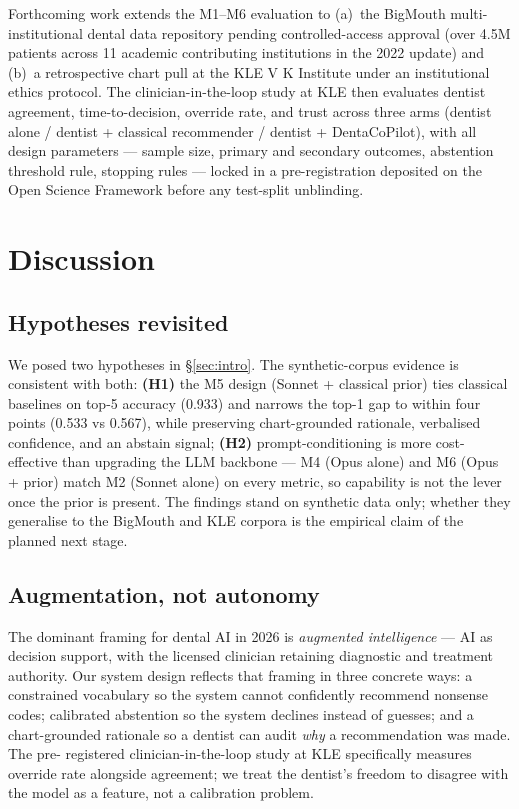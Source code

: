 \documentclass[preprint,authoryear,1p,12pt]{elsarticle}
\begin{document}
Forthcoming work extends the M1--M6 evaluation to (a)~the BigMouth
multi-institutional dental data repository \citep{walji2014bigmouth,walji2022bigmouth}
pending controlled-access approval (over 4.5M patients across 11 academic
contributing institutions in the 2022 update) and (b)~a retrospective
chart pull at the KLE V K Institute under an institutional ethics
protocol. The clinician-in-the-loop study at KLE then evaluates dentist
agreement, time-to-decision, override rate, and trust across three arms
(dentist alone / dentist + classical recommender / dentist +
DentaCoPilot), with all design parameters --- sample size, primary and
secondary outcomes, abstention threshold rule, stopping rules ---
locked in a pre-registration deposited on the Open Science Framework
\citep{nosek2018preregistration} before any test-split unblinding.

\section{Discussion}
\label{sec:discussion}

\subsection{Hypotheses revisited}

We posed two hypotheses in \S\ref{sec:intro}. The synthetic-corpus
evidence is consistent with both: \textbf{(H1)} the M5 design (Sonnet +
classical prior) ties classical baselines on top-5 accuracy (0.933) and
narrows the top-1 gap to within four points (0.533 vs 0.567), while
preserving chart-grounded rationale, verbalised confidence, and an
abstain signal; \textbf{(H2)} prompt-conditioning is more cost-effective
than upgrading the LLM backbone --- M4 (Opus alone) and M6 (Opus +
prior) match M2 (Sonnet alone) on every metric, so capability is not
the lever once the prior is present. The findings stand on synthetic
data only; whether they generalise to the BigMouth and KLE corpora is
the empirical claim of the planned next stage.

\subsection{Augmentation, not autonomy}

The dominant framing for dental AI in 2026 is \emph{augmented intelligence}
--- AI as decision support, with the licensed clinician retaining
diagnostic and treatment authority. Our system design reflects that
framing in three concrete ways: a constrained vocabulary so the system
cannot confidently recommend nonsense codes; calibrated abstention so
the system declines instead of guesses; and a chart-grounded rationale
so a dentist can audit \emph{why} a recommendation was made. The pre-
registered clinician-in-the-loop study at KLE specifically measures
override rate alongside agreement; we treat the dentist's freedom to
disagree with the model as a feature, not a calibration problem.
\end{document}
